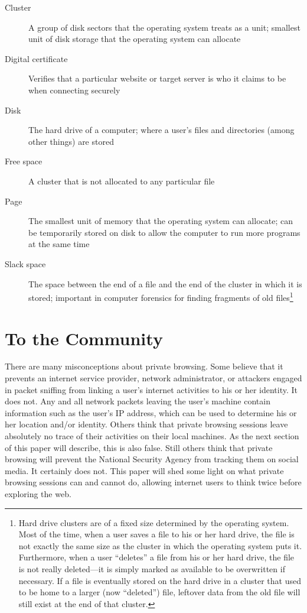 \documentclass[pdftex,letterpaper,titlepage,12pt]{article}
\begin{document}
	\begin{description}
	  \item[Cluster] A group of disk sectors that the operating system
	  treats as a unit; smallest unit of disk storage that the operating
	  system can allocate
	  \item[Digital certificate] Verifies that a particular website or target
	  server is who it claims to be when connecting securely
	  \item[Disk] The hard drive of a computer; where a user's files and
	  directories (among other things) are stored
	  \item[Free space] A cluster that is not allocated to any particular 
	  file
	  \item[Page] The smallest unit of memory that the operating system can
	  allocate; can be temporarily stored on disk to allow the computer to run
	  more programs at the same time
	  \item[Slack space] The space between the end of a file and the end of 
	  the cluster in which it is stored; important in computer forensics for
	  finding fragments of old files\footnote{Hard drive clusters are of a 
	  fixed size determined by the operating system. Most of the time, when a 
	  user saves a file to his or her hard drive, the file is not exactly the 
	  same size as the cluster in which the operating system puts it. 
	  Furthermore, when a user ``deletes'' a file from his or her hard drive, 
	  the file is not really deleted---it is simply marked as available to be
      overwritten if necessary. If a file is eventually stored on the hard 
	  drive in a cluster that used to be home to a larger (now ``deleted'') 
	  file, leftover data from the old file will still exist at the end of that
      cluster.}
	\end{description}
    
  \section{To the Community}
  There are many misconceptions about private browsing. Some believe that it
  prevents an internet service provider, network administrator, or attackers
  engaged in packet sniffing from linking a user's internet activities to his
  or her identity. It does not. Any and all network packets leaving the user's
  machine contain information such as the user's IP address, which can be used
  to determine his or her location and/or identity. Others think that private
  browsing sessions leave absolutely no trace of their activities on their
  local machines. As the next section of this paper will describe, this is also
  false. Still others think that private browsing will prevent the National
  Security Agency from tracking them on social media. It certainly does not.
  This paper will shed some light on what private browsing sessions can and
  cannot do, allowing internet users to think twice before exploring the web.
\end{document}
